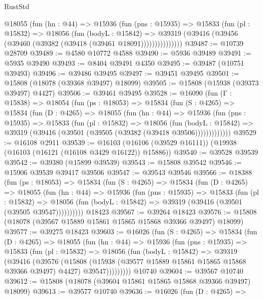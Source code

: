 \begin{lexlean}{RustStd}
\begin{coremodule}
            @18055
              (fun (hn : @44) =>
              @15936
                (fun (pns : @15935) =>
                @15833
                  (fun (pl : @15832) =>
                  @18056
                    (fun (bodyL : @15842) =>
                    @39319 (@39416 (@39456 (@39460 (@39382 (@39418 (@39461 @18091)))))))))))))))
@39487 := @10739 @28709
@39489 := @4580 @10772 @4588
@39490 := @5936 @39489
@39491 := @5935 @39490
@39493 := @8404 @39491 @4350
@39495 := @39487 (@10751 @39493)
@39496 := @39486 @39495
@39497 := @39451 @39495
@39501 := @15808 (@18078 (@39368 @39497) @18099)
@39505 := @15808 (@15938 (@39373 @39497) @4427)
@39506 := @39461 @39495
@39528 := @16090
    (fun (Γ : @15838) =>
    @18054
      (fun (ps : @18053) =>
      @15834
        (fun (S : @4265) =>
        @15834
          (fun (D : @4265) =>
          @18055
            (fun (hn : @44) =>
            @15936
              (fun (pns : @15935) =>
              @15833
                (fun (pl : @15832) =>
                @18056
                  (fun (bodyL : @15842) =>
                  @39319 (@39416 (@39501 (@39505 (@39382 (@39418 @39506)))))))))))))
@39529 := @16108 @2911
@39539 := @16103 (@16106 (@39529 @16111)) (@19938 (@16103 (@16121 (@16108 @3429 @16122)) @15886))
@39540 := @39528 @39539
@39542 := @39380 (@15899 @39539)
@39543 := @15808 @39542
@39546 := @15906 @39539 @39417 @39506
@39547 := @39543 @39546
@39566 := @18388
    (fun (ps : @18053) =>
    @15834
      (fun (S : @4265) =>
      @15834
        (fun (D : @4265) =>
        @18055
          (fun (hn : @44) =>
          @15936
            (fun (pns : @15935) =>
            @15833
              (fun (pl : @15832) =>
              @18056 (fun (bodyL : @15842) => @39319 (@39416 (@39501 (@39505 @39547))))))))))
    @18423
@39567 := @39264 @18423
@39576 := @15808 (@18078 (@39567 @15889 @15861 @15865 @15868 @39366 @39497) @18099)
@39577 := @39275 @18423
@39603 := @16026
    (fun (S : @4265) =>
    @15834
      (fun (D : @4265) =>
      @18055
        (fun (hn : @44) =>
        @15936
          (fun (pns : @15935) =>
          @15833
            (fun (pl : @15832) =>
            @18056
              (fun (bodyL : @15842) =>
              @39319
                (@39416
                  (@39576
                    (@15808
                      (@15938 (@39577 @15889 @15861 @15865 @15868 @39366 @39497) @4427)
                      @39547)))))))))
    @10740
@39604 := @39567 @10740
@39612 := @15808 (@18078 (@39604 @15861 @15865 @15868 @39366 @39497) @18099)
@39613 := @39577 @10740
@39636 := @16026
    (fun (D : @4265) =>

\end{coremodule}
\end{lexlean}
